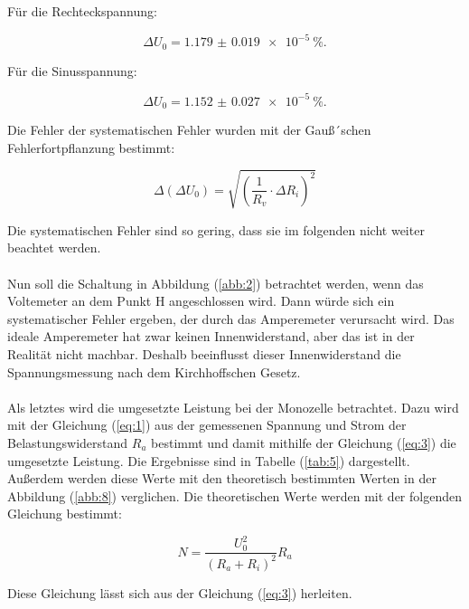 Für die Rechteckspannung:

\begin{equation*}
  \Delta U_0 = \SI{1.179(19)e-5}{\percent}.
\end{equation*}

Für die Sinusspannung:

\begin{equation*}
  \Delta U_0 = \SI{1.152(27)e-5}{\percent}.
\end{equation*}

Die Fehler der systematischen Fehler wurden mit der Gauß´schen Fehlerfortpflanzung
bestimmt:

\begin{equation*}
  \Delta (\Delta U_0) = \sqrt{\left(\frac{1}{R_v} \cdot \Delta R_i\right)^2}
\end{equation*}

Die systematischen Fehler sind so gering, dass sie im folgenden nicht weiter beachtet werden. \\\\

Nun soll die Schaltung in Abbildung (\ref{abb:2}) betrachtet werden, wenn das Voltemeter an
dem Punkt H angeschlossen wird. Dann würde sich ein systematischer Fehler ergeben, der
durch das Amperemeter verursacht wird. Das ideale Amperemeter hat zwar keinen Innenwiderstand,
aber das ist in der Realität nicht machbar. Deshalb beeinflusst dieser Innenwiderstand
die Spannungsmessung nach dem Kirchhoffschen Gesetz.\\\\

Als letztes wird die umgesetzte Leistung bei der Monozelle betrachtet. Dazu wird mit der
Gleichung (\ref{eq:1}) aus der gemessenen Spannung und Strom der Belastungswiderstand $R_a$ bestimmt
und damit mithilfe der Gleichung (\ref{eq:3}) die umgesetzte Leistung. Die Ergebnisse sind
in Tabelle (\ref{tab:5}) dargestellt. Außerdem werden diese Werte mit den theoretisch
bestimmten Werten in der Abbildung (\ref{abb:8}) verglichen. Die theoretischen Werte
werden mit der folgenden Gleichung bestimmt:

\begin{equation*}
  N = \frac{U_0^2}{(R_a + R_i)^2} R_a
\end{equation*}

Diese Gleichung lässt sich aus der Gleichung (\ref{eq:3}) herleiten.

